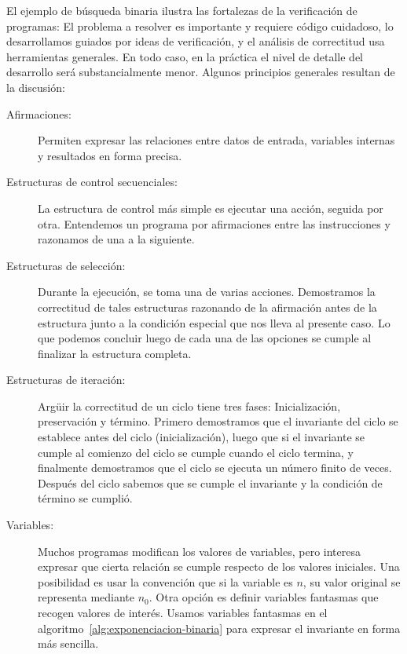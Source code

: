   El ejemplo de búsqueda binaria
  ilustra las fortalezas de la verificación de programas:
  El problema a resolver es importante y requiere código cuidadoso,
  lo desarrollamos guiados por ideas de verificación,
  y el análisis de correctitud usa herramientas generales.
  En todo caso,
  en la práctica el nivel de detalle del desarrollo
  será substancialmente menor.
  Algunos principios generales resultan de la discusión:
  \begin{description}
  \item[Afirmaciones:]
    Permiten expresar las relaciones entre datos de entrada,
    variables internas y resultados en forma precisa.
  \item[Estructuras de control secuenciales:]%
    La estructura de control más simple es ejecutar una acción,
    seguida por otra.
    Entendemos un programa por afirmaciones entre las instrucciones
    y razonamos de una a la siguiente.
  \item[Estructuras de selección:]
    Durante la ejecución,
    se toma una de varias acciones.
    Demostramos la correctitud de tales estructuras
    razonando de la afirmación antes de la estructura
    junto a la condición especial que nos lleva al presente caso.
    Lo que podemos concluir luego de cada una de las opciones
    se cumple al finalizar la estructura completa.
  \item[Estructuras de iteración:]
    Argüir la correctitud de un ciclo tiene tres fases:
    Inicialización,
    preservación
    y término.
    Primero demostramos que el invariante del ciclo
    se establece antes del ciclo
    (inicialización),
    luego que si el invariante se cumple al comienzo del ciclo
    se cumple cuando el ciclo termina,
    y finalmente demostramos que el ciclo
    se ejecuta un número finito de veces.
    Después del ciclo sabemos que se cumple el invariante
    y la condición de término se cumplió.
  \item[Variables:]
    Muchos programas modifican los valores de variables,
    pero interesa expresar
    que cierta relación se cumple respecto de los valores iniciales.
    Una posibilidad
    es usar la convención que si la variable es \(n\),
    su valor original se representa mediante \(n_0\).
    Otra opción es definir variables fantasmas
    que recogen valores de interés.
    Usamos variables fantasmas
    en el algoritmo~\ref{alg:exponenciacion-binaria}
    para expresar el invariante en forma más sencilla.

\end{description}
